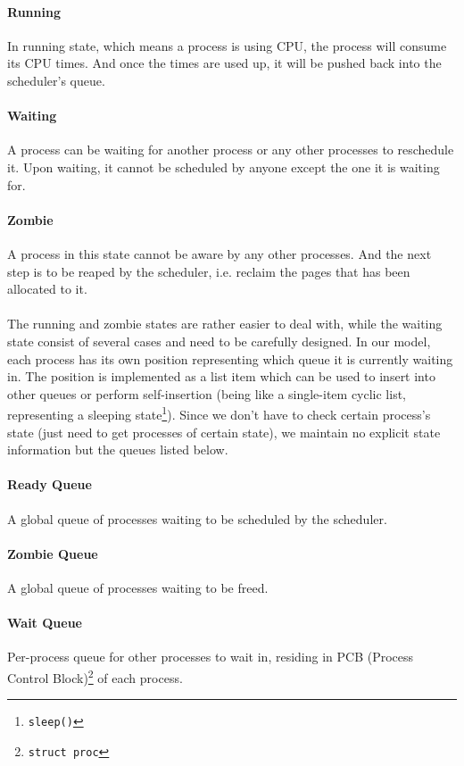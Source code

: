 \documentclass[11pt,a4paper]{article}
\begin{document}
\paragraph{Running}
In running state, which means a process is using CPU, the process will consume its CPU times. And once the times are used up, it will be pushed back into the scheduler's queue.

\paragraph{Waiting}
A process can be waiting for another process or any other processes to reschedule it. Upon waiting, it cannot be scheduled by anyone except the one it is waiting for.

\paragraph{Zombie}
A process in this state cannot be aware by any other processes. And the next step is to be reaped by the scheduler, i.e. reclaim the pages that has been allocated to it.

\paragraph{}
The running and zombie states are rather easier to deal with, while the waiting state consist of several cases and need to be carefully designed. In our model, each process has its own position representing which queue it is currently waiting in. The position is implemented as a list item which can be used to insert into other queues or perform self-insertion (being like a single-item cyclic list, representing a sleeping state\footnote{\texttt{sleep()}}). Since we don't have to check certain process's state (just need to get processes of certain state), we maintain no explicit state information but the queues listed below.

\paragraph{Ready Queue}
A global queue of processes waiting to be scheduled by the scheduler. 

\paragraph{Zombie Queue}
A global queue of processes waiting to be freed. 

\paragraph{Wait Queue}
Per-process queue for other processes to wait in, residing in PCB (Process Control Block)\footnote{\texttt{struct proc}} of each process.
\end{document}
